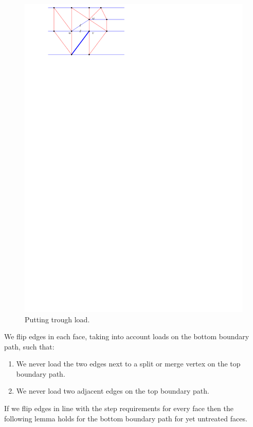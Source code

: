   \begin{figure}[h]
    \centering
    \includegraphics[scale=1]{blueFaceSubdivision/img/puttingTroughLoad.pdf}
    \caption{Putting trough load.}
    \label{fig:subdiv:putTrougLoad}
  \end{figure}


  We flip edges in each face, taking into account loads on the bottom boundary path, such that:

  \begin{enumerate}
    \item We never load the two edges next to a split or merge vertex on the top boundary path.
    \item We never load two adjacent edges on the top boundary path.
  \end{enumerate}

  If we flip edges in line with the step requirements for every face then the following lemma holds for the bottom boundary path for yet untreated faces.

